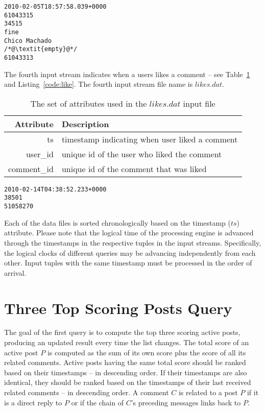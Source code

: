 \documentclass{sig-alternate}
\begin{document}
\lstset{}
\begin{lstlisting}[float=ht,caption={First line from the $comments.dat$ file -- one attribute per line of listing},label={code:comment}]
2010-02-05T18:57:58.039+0000
61043315
34515
fine
Chico Machado
/*@\textit{empty}@*/
61043313
\end{lstlisting}

The fourth input stream indicates when a users likes a comment -- see Table~\ref{table:like} and Listing~\ref{code:like}. The fourth input stream file name is $likes.dat$.

\begin{table}[ht]
	\caption{The set of attributes used in the $likes.dat$ input file}
	\centering 
	\begin{tabular}{r p{5.2cm}}
		\toprule
		Attribute		&	 Description\\
		\midrule
		ts			&	timestamp indicating when user liked a comment\\[2ex]
		user\_id	&	unique id of the user who liked the comment\\[2ex]		
		comment\_id	& 	unique id of the comment that was liked\\[2ex]		
		\bottomrule 
	\end{tabular}
	\label{table:like}
\end{table}



\lstset{}
\begin{lstlisting}[float=ht,caption={First line from the $comments.dat$ file -- one attribute per line of listing},label={code:like}]
2010-02-14T04:38:52.233+0000
38501
51058270
\end{lstlisting}

Each of the data files is sorted chronologically based on the timestamp ($ts$) attribute. Please note that the logical time of the processing engine is advanced through the timestamps in the respective tuples in the input streams. Specifically, the logical clocks of different queries may be advancing independently from each other. Input tuples with the same timestamp must be processed in the order of arrival.





\section{Three Top Scoring Posts Query}
\label{sec:query1}
The goal of the first query is to compute the top three scoring active posts, producing an updated result every time the list changes. The total score of an active post $P$ is computed as the sum of its own score plus the score of all its related comments. Active posts having the same total score should be ranked based on their timestamps -- in descending order. If their timestamps are also identical, they should be ranked based on the timestamps of their last received related comments -- in descending order. A comment $C$ is related to a post $P$ if it is a direct reply to $P$ or if the chain of $C$'s preceding messages links back to $P$.
\end{document}
